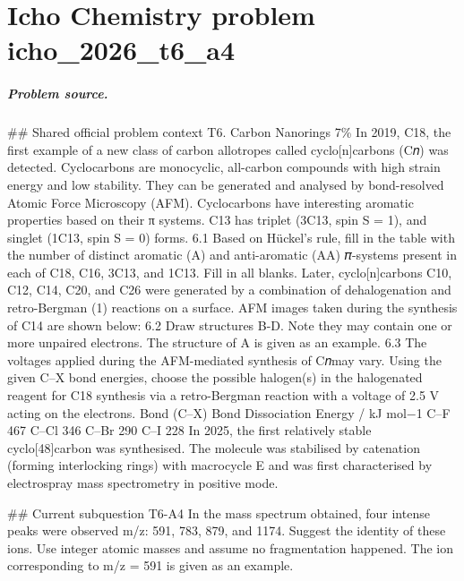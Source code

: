 
\chapter{Icho Chemistry problem icho\_2026\_t6\_a4}
\label{ch:IChO2026Problems_problem_icho_2026_t6_a4}

\paragraph{Problem source.}
\#\# Shared official problem context
T6. Carbon Nanorings 7\% In 2019, C18, the first example of a new class of carbon allotropes called cyclo[n]carbons (C𝑛) was detected. Cyclocarbons are monocyclic, all-carbon compounds with high strain energy and low stability. They can be generated and analysed by bond-resolved Atomic Force Microscopy (AFM). Cyclocarbons have interesting aromatic properties based on their π systems. C13 has triplet (3C13, spin S = 1), and singlet (1C13, spin S = 0) forms. 6.1 Based on Hückel’s rule, fill in the table with the number of distinct aromatic (A) and anti-aromatic (AA) 𝜋-systems present in each of C18, C16, 3C13, and 1C13. Fill in all blanks. Later, cyclo[n]carbons C10, C12, C14, C20, and C26 were generated by a combination of dehalogenation and retro-Bergman (1) reactions on a surface. AFM images taken during the synthesis of C14 are shown below: 6.2 Draw structures B-D. Note they may contain one or more unpaired electrons. The structure of A is given as an example. 6.3 The voltages applied during the AFM-mediated synthesis of C𝑛may vary. Using the given C–X bond energies, choose the possible halogen(s) in the halogenated reagent for C18 synthesis via a retro-Bergman reaction with a voltage of 2.5 V acting on the electrons. Bond (C–X) Bond Dissociation Energy / kJ mol−1 C–F 467 C–Cl 346 C–Br 290 C–I 228 In 2025, the first relatively stable cyclo[48]carbon was synthesised. The molecule was stabilised by catenation (forming interlocking rings) with macrocycle E and was first characterised by electrospray mass spectrometry in positive mode.

\#\# Current subquestion T6-A4
In the mass spectrum obtained, four intense peaks were observed m/z: 591, 783, 879, and 1174. Suggest the identity of these ions. Use integer atomic masses and assume no fragmentation happened. The ion corresponding to m/z = 591 is given as an example.

